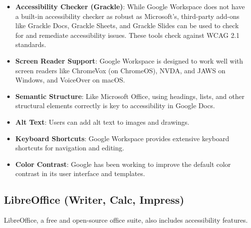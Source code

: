 \begin{itemize}
	\item \textbf{Accessibility Checker (Grackle)}: While Google Workspace does not have a built-in accessibility checker as robust as Microsoft's, third-party add-ons like Grackle Docs, Grackle Sheets, and Grackle Slides can be used to check for and remediate accessibility issues. These tools check against WCAG 2.1 standards.
	\item \textbf{Screen Reader Support}: Google Workspace is designed to work well with screen readers like ChromeVox (on ChromeOS), NVDA, and JAWS on Windows, and VoiceOver on macOS.
	\item \textbf{Semantic Structure}: Like Microsoft Office, using headings, lists, and other structural elements correctly is key to accessibility in Google Docs.
	\item \textbf{Alt Text}: Users can add alt text to images and drawings.
	\item \textbf{Keyboard Shortcuts}: Google Workspace provides extensive keyboard shortcuts for navigation and editing.
	\item \textbf{Color Contrast}: Google has been working to improve the default color contrast in its user interface and templates.
\end{itemize}

\subsection{LibreOffice (Writer, Calc, Impress)}
\label{subsec:libreoffice-accessibility}

LibreOffice, a free and open-source office suite, also includes accessibility features.

